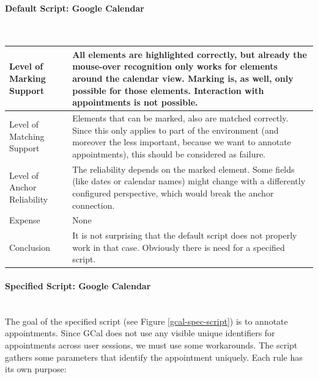 \paragraph{Default Script: Google Calendar}\mbox{}\\
\begin{tabular}{|p{}| p{} |}
\hline 
Level of Marking Support & All elements are highlighted correctly, but already the mouse-over recognition only works for elements around the calendar view. Marking is, as well, only possible for those elements. Interaction with appointments is not possible.\\ 
\hline 
Level of Matching Support & Elements that can be marked, also are matched correctly. Since this only applies to part of the environment (and moreover the less important, because we want to annotate appointments), this should be considered as failure. \\ 
\hline 
Level of Anchor Reliability & The reliability depends on the marked element. Some fields (like dates or calendar names) might change with a differently configured perspective, which would break the anchor connection.  \\ 
\hline 
Expense & None \\ 
\hline 
Conclusion & It is not surprising that the default script does not properly work in that case. Obviously there is need for a specified script.\\ 
\hline 
\end{tabular} 

\paragraph{Specified Script: Google Calendar}\mbox{}\\
The goal of the specified script (see Figure \ref{gcal-spec-script}) is to annotate appointments. Since GCal does not use any visible unique identifiers for appointments across user sessions, we must use some workarounds. The script gathers some parameters that identify the appointment uniquely. Each rule has its own purpose:

